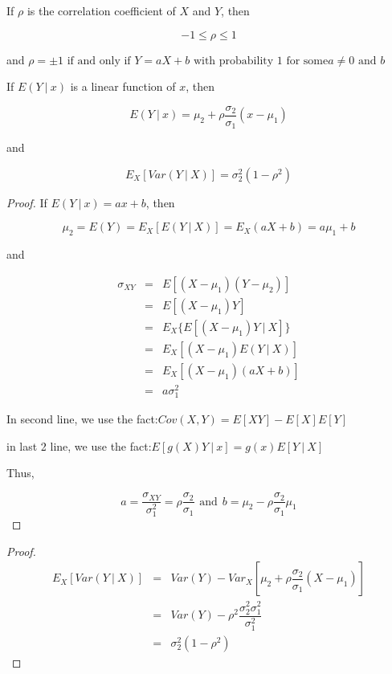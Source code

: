 \begin{thm*}
	If $\rho$ is the correlation coefficient of $X$ and $Y$, then
	
	$$-1 \leq \rho \leq 1$$
	
	and $\rho = \pm 1 \text{ if and only if } Y = aX + b \text{ with probability } 1 \text{ for some} a \neq 0 \text{ and } b $
\end{thm*}

\begin{thm*}
	If $E(Y~|~x)$ is a linear function of $x$, then
	
	$$E(Y~|~x) = \mu_2 + \rho \dfrac{\sigma_2}{\sigma_1}(x - \mu_1)$$
	
	and
	
	$$E_X[Var(Y~|~X)] = \sigma_2^2(1 - \rho^2)$$
\end{thm*}

\begin{proof}
	If $E(Y~|~x) = ax + b$, then
	
	$$\mu_2 = E(Y) = E_X[E(Y~|~X)] = E_X(aX + b) = a\mu_1 + b$$
	
	and
	
	\begin{eqnarray*}
		\sigma_{XY} &=& E[(X - \mu_1)(Y - \mu_2)] \\
		&=& E[(X - \mu_1)Y] \hspace{10pt} \\
		&=& E_X\{E[(X - \mu_1)Y~|~X]\}\\
		&=& E_X[(X - \mu_1)E(Y~|~X)]\\
		&=& E_X[(X - \mu_1)(aX + b)]\\
		&=& a\sigma_1^2
	\end{eqnarray*}
	
	In second line, we use the fact:$Cov(X,Y) = E[XY] - E[X]E[Y]$
	
	in last 2 line, we use the fact:$E[g(X)Y~|~x] = g(x)E[Y~|~X]$
	
	Thus,
	
	$$a = \dfrac{\sigma_{XY}}{\sigma_1^2} = \rho \dfrac{\sigma_2}{\sigma_1} \hspace{5pt} \text{and} \hspace{5pt} b = \mu_2 - \rho \dfrac{\sigma_2}{\sigma_1}\mu_1$$
	
\end{proof}

\begin{proof}
	\begin{eqnarray*}
		E_X[Var(Y~|~X)] &=& Var(Y) - Var_X\left[ \mu_2 + \rho \dfrac{\sigma_2}{\sigma_1}(X - \mu_1) \right] \\
		&=& Var(Y) - \rho^2 \dfrac{\sigma_2^2 \sigma_1^2}{\sigma_1^2}\\
		&=& \sigma^2_2(1 - \rho^2)
	\end{eqnarray*}
\end{proof}

